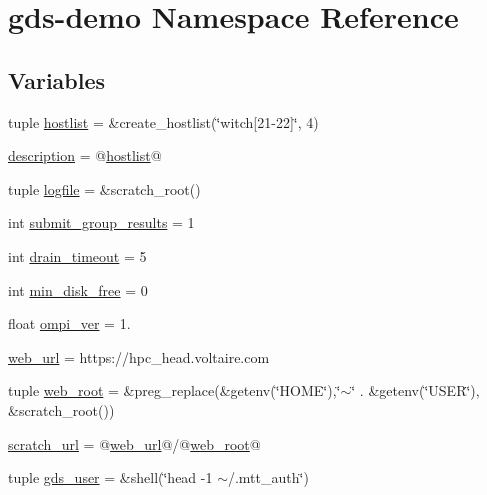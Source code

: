 \hypertarget{namespacegds-demo}{\section{gds-\/demo Namespace Reference}
\label{namespacegds-demo}
}
\subsection*{Variables}
\begin{DoxyCompactItemize}
\item 
tuple \hyperlink{namespacegds-demo_a021b9480541541d7ed577ad25eddf802}{hostlist} = \&create\-\_\-hostlist(\char`\"{}witch\mbox{[}21-\/22\mbox{]}\char`\"{}, 4)
\item 
\hyperlink{namespacegds-demo_a8ce383223449cab9f79575209d7dff2a}{description} = @\hyperlink{namespacegds-demo_a021b9480541541d7ed577ad25eddf802}{hostlist}@
\item 
tuple \hyperlink{namespacegds-demo_afef42fececa25d4cb15454b29b84e89b}{logfile} = \&scratch\-\_\-root()
\item 
int \hyperlink{namespacegds-demo_a62244f93362dda6490422a8beb98d7c6}{submit\-\_\-group\-\_\-results} = 1
\item 
int \hyperlink{namespacegds-demo_a87264971a99b7a376dc48ab3d1cd7469}{drain\-\_\-timeout} = 5
\item 
int \hyperlink{namespacegds-demo_a18c78141084f23069438c080ec110e3c}{min\-\_\-disk\-\_\-free} = 0
\item 
float \hyperlink{namespacegds-demo_aa7b4ee1aa52c894100818af632edc7dc}{ompi\-\_\-ver} = 1.
\item 
\hyperlink{namespacegds-demo_adc1de3305ccc0c692368fda2622c819f}{web\-\_\-url} = https\-://hpc\-\_\-head.\-voltaire.\-com
\item 
tuple \hyperlink{namespacegds-demo_aa8573740e3b2e7a32c35d743695d3748}{web\-\_\-root} = \&preg\-\_\-replace(\&getenv(\char`\"{}H\-O\-M\-E\char`\"{}),\char`\"{}$\sim$\char`\"{} . \&getenv(\char`\"{}U\-S\-E\-R\char`\"{}), \&scratch\-\_\-root())
\item 
\hyperlink{namespacegds-demo_a825b45a7f6cfdf6119a766e9938fbd38}{scratch\-\_\-url} = @\hyperlink{namespacegds-demo_adc1de3305ccc0c692368fda2622c819f}{web\-\_\-url}@/@\hyperlink{namespacegds-demo_aa8573740e3b2e7a32c35d743695d3748}{web\-\_\-root}@
\item 
tuple \hyperlink{namespacegds-demo_aa9c2bc4e0238cad5803c9b33aace1e59}{gds\-\_\-user} = \&shell(\char`\"{}head -\/1 $\sim$/.mtt\-\_\-auth\char`\"{})

\end{DoxyCompactItemize}
